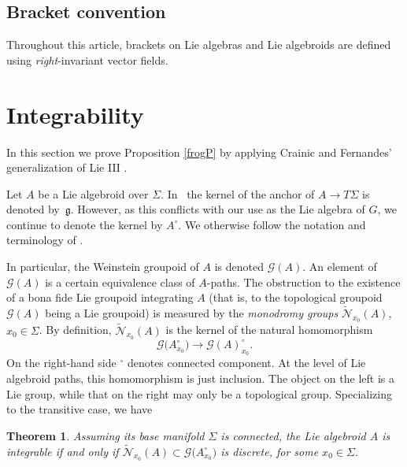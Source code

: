 \documentclass[pdftex]{sigma}%
\numberwithin{equation}{section}
\newtheorem{Theorem}{Theorem}[section]
\begin{document}
\subsection*{Bracket convention}
Throughout this article, brackets on
Lie algebras and Lie algebroids are defined using {\em
right}-invariant vector fields.

\section{Integrability}
\label{newsec}

In this section we prove Proposition \ref{frogP} by applying Crainic
and Fernandes' generalization of Lie III \cite{Crainic_Fernandes_03}.

Let $A$ be a Lie algebroid over $\Sigma$. In~\cite{Crainic_Fernandes_03, Crainic_Fernandes_11} the kernel of the
anchor of $A \rightarrow T \Sigma$ is denoted by~${\mathfrak g}
$. However, as this conflicts with our use as the Lie algebra of $G$,
we continue to denote the kernel by $A^\circ$. We otherwise follow the
notation and terminology of \cite{Crainic_Fernandes_11}.

In particular, the Weinstein groupoid of $A$ is denoted ${\mathcal
G}(A)$. An element of ${\mathcal G}(A)$ is a certain equivalence class
of $A$-paths. The obstruction to the existence of a bona fide Lie
groupoid integrating $A$ (that is, to the topological groupoid
${\mathcal G}(A)$ being a Lie groupoid) is measured by the {\it monodromy groups} $\tilde {\mathcal N}_{x_0}(A) $, $x_0 \in \Sigma
$. By definition, $\tilde {\mathcal N}_{x_0}(A) $ is the kernel of the
natural homomorphism
\begin{equation}
{\mathcal G}\big(A^\circ_{x_0}\big)\rightarrow {\mathcal G}(A)^\circ_{x_0} \label{dqp}.
\end{equation} On the right-hand side ${}^\circ$ denotes connected
component. At the level of Lie algebroid paths, this homomorphism is
just inclusion. The object on the left is a Lie group, while that on
the right may only be a topological group. Specializing
\cite{Crainic_Fernandes_03} to the transitive case, we have

\begin{Theorem}%
 Assuming its base manifold $\Sigma $ is connected, the Lie algebroid
 $A$ is integrable if and only if
 $\tilde {\mathcal N}_{x_0}(A) \subset {\mathcal G}\big(A^\circ_{x_0}\big)$
 is discrete, for some $x_0 \in \Sigma $.
\end{Theorem}
\end{document}
